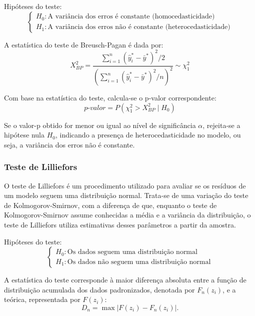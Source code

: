 \documentclass[12pt,a4paper,header]{abnt}
\begin{document}
Hipóteses do teste:
\begin{equation*}
\begin{cases}
H_0: \text{A variância dos erros é constante (homocedasticidade)} \\
H_1: \text{A variância dos erros não é constante (heterocedasticidade)}
\end{cases}
\end{equation*}

A estatística do teste de Breusch-Pagan é dada por:
\begin{equation}
    X^2_{BP} = \frac{\sum_{i=1}^{n}(\hat{y}_i^* - \bar{y}^*)^2/2}{\left(\sum_{i=1}^{n}(\hat{y}_i^* - \bar{y}^*)^2 / n\right)^2} \sim \chi^2_1
\end{equation}

Com base na estatística do teste, calcula-se o p-valor correspondente:
\begin{equation}
    \textit{p-valor} = P\left(\chi^2_1 > X^2_{BP} \mid H_0\right)
\end{equation}

Se o valor-p obtido for menor ou igual ao nível de significância \( \alpha \), rejeita-se a hipótese nula \( H_0 \), indicando a presença de heterocedasticidade no modelo, ou seja, a variância dos erros não é constante.


\subsubsection{Teste de Lilliefors} \label{sec:lilliefors}
O teste de Lilliefors é um procedimento utilizado para avaliar se os resíduos de um modelo seguem uma distribuição normal. Trata-se de uma variação do teste de Kolmogorov-Smirnov, com a diferença de que, enquanto o teste de Kolmogorov-Smirnov assume conhecidas a média e a variância da distribuição, o teste de Lilliefors utiliza estimativas desses parâmetros a partir da amostra.

Hipóteses do teste:
\begin{equation*}
\begin{cases}
H_0: \text{Os dados seguem uma distribuição normal} \\
H_1: \text{Os dados não seguem uma distribuição normal}
\end{cases}
\end{equation*}

A estatística do teste corresponde à maior diferença absoluta entre a função de distribuição acumulada dos dados padronizados, denotada por $F_n(z_i)$, e a teórica, representada por $F(z_i)$:
\begin{equation}
    D_n = \max|F(z_i) - F_n(z_i)|.
\end{equation}
\end{document}
